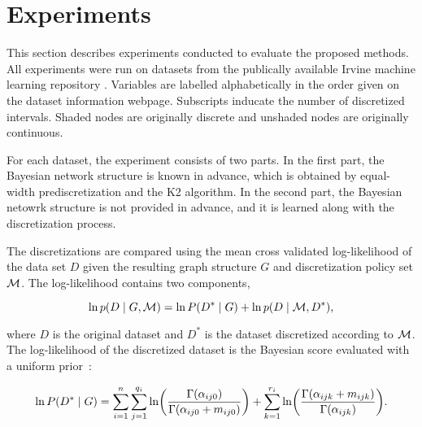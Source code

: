 
\section{Experiments}
\label{sec:experiments}

This section describes experiments conducted to evaluate the proposed methods.
All experiments were run on datasets from the publically available Irvine machine learning repository \citep{Lichman_2013}.
Variables are labelled alphabetically in the order given on the dataset information webpage.
Subscripts inducate the number of discretized intervals.
Shaded nodes are originally discrete and unshaded nodes are originally continuous.

For each dataset, the experiment consists of two parts.
In the first part, the Bayesian network structure is known in advance, which is obtained by equal-width prediscretization and the K2 algorithm.
In the second part, the Bayesian netowrk structure is not provided in advance, and it is learned along with the discretization process.

The discretizations are compared using the mean cross validated log-likelihood of the data set $D$ given the resulting graph structure $G$ and discretization policy set $\mathcal{M}$.
The log-likelihood contains two components,

\begin{equation}
\ln p(D\mid G, \mathcal{M}) = \ln P(D^*\mid G) + \ln p(D\mid \mathcal{M}, D^*)\text{,}
\end{equation}

\noindent
where $D$ is the original dataset and $D^*$ is the dataset discretized according to $\mathcal{M}$.
The log-likelihood of the discretized dataset is the Bayesian score evaluated with a uniform prior~\citep{neapolitan2004learning}:

\begin{equation}
  \ln P(D^*\mid G) = \sum_{i=1}^n \sum_{j=1}^{q_i} \ln\paren{
    \frac{
      \Gamma\paren{\alpha_{ij0}}
    }{
      \Gamma\paren{\alpha_{ij0} + m_{ij0}}
    }
  } + \sum_{k=1}^{r_i} \ln\paren{
    \frac{
      \Gamma\paren{\alpha_{ijk} + m_{ijk}}
    }{
      \Gamma\paren{\alpha_{ijk}}
    }
  }\text{.}
\end{equation}


